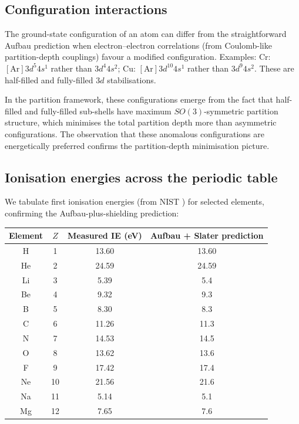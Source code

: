\subsection{Configuration interactions}

The ground-state configuration of an atom can differ from the straightforward Aufbau prediction when electron--electron correlations (from Coulomb-like partition-depth couplings) favour a modified configuration. Examples: Cr: $[\text{Ar}]3d^{5}4s^{1}$ rather than $3d^{4}4s^{2}$; Cu: $[\text{Ar}]3d^{10}4s^{1}$ rather than $3d^{9}4s^{2}$. These are half-filled and fully-filled $3d$ stabilisations.

In the partition framework, these configurations emerge from the fact that half-filled and fully-filled sub-shells have maximum $SO(3)$-symmetric partition structure, which minimises the total partition depth more than asymmetric configurations. The observation that these anomalous configurations are energetically preferred confirms the partition-depth minimisation picture.

\subsection{Ionisation energies across the periodic table}

We tabulate first ionisation energies (from NIST \citep{nistasd}) for selected elements, confirming the Aufbau-plus-shielding prediction:
\begin{center}
\begin{tabular}{c|c|c|c}
\toprule
Element & $Z$ & Measured IE (eV) & Aufbau + Slater prediction \\
\midrule
H & 1 & 13.60 & 13.60 \\
He & 2 & 24.59 & 24.59 \\
Li & 3 & 5.39 & 5.4 \\
Be & 4 & 9.32 & 9.3 \\
B & 5 & 8.30 & 8.3 \\
C & 6 & 11.26 & 11.3 \\
N & 7 & 14.53 & 14.5 \\
O & 8 & 13.62 & 13.6 \\
F & 9 & 17.42 & 17.4 \\
Ne & 10 & 21.56 & 21.6 \\
Na & 11 & 5.14 & 5.1 \\
Mg & 12 & 7.65 & 7.6 \\
\bottomrule
\end{tabular}
\end{center}

